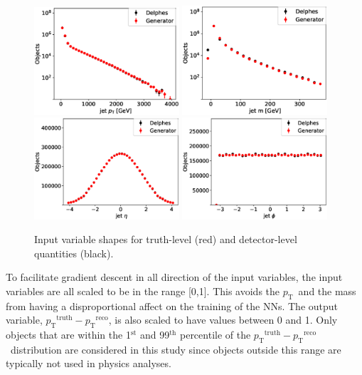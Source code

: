 \documentclass[showpacs,showkeys,preprint,prd,nofootinbib,linenumbers,12pt,superscriptaddress]{revtex4-1}
\def\pt{\ensuremath{p_{\mathrm{T}}}}
\def\ptRes{\ensuremath{\pt^{\mathrm{truth}}-\pt^{\mathrm{reco}}}}
\begin{document}
\begin{figure}[h]
  \includegraphics[width=0.48\textwidth]{figures/nn/jet_pT_prescaling_log.eps}
  \includegraphics[width=0.48\textwidth]{figures/nn/jet_m_prescaling_log.eps}\\
  \includegraphics[width=0.48\textwidth]{figures/nn/jet_eta_prescaling.eps}
  \includegraphics[width=0.48\textwidth]{figures/nn/jet_phi_prescaling.eps}
  \caption{Input variable shapes for truth-level (red) and detector-level quantities (black).}
  \label{fig:nnInputsPrescaling}
\end{figure}

To facilitate gradient descent in all direction of the input variables, the input variables are all scaled to be in the range [0,1]. This avoids the \pt\ and the mass from having a disproportional affect on the training of the NNs. The output variable, \ptRes, is also scaled to have values between 0 and 1. Only objects that 
are within the 1$^{\mathrm{st}}$ and 99$^{\mathrm{th}}$ percentile of the \ptRes\ distribution are considered in this study since objects outside this range are typically not used in physics analyses.
\end{document}
